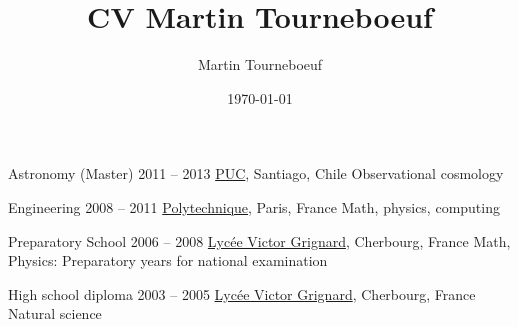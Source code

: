 \def\tbflanguage{english}
\def\tbfbordertop{1}
\def\tbfborderleft{0.7}


%
%

\title{CV Martin Tourneboeuf}
\author{Martin Tourneboeuf}
\date{\today}









\begin{coordinatelist}
\end{coordinatelist}



\begin{yearlist}[7.7][\tbfborderleft][4]


\item[Astronomy (Master)]{2011 -- 2013}
  {
  \href{http://www.uc.cl/}{PUC}, Santiago, Chile
  }
  {   Observational cosmology}


\item[Engineering]{2008 -- 2011}
  {
  \tbfix
  \href{https://www.polytechnique.edu/}{Polytechnique}, Paris, France
  }
  {    Math, physics, computing}


\item[Preparatory School]{2006 -- 2008}
  {
  \href{http://www.lycee-grignard.fr/}{Lyc\'ee Victor Grignard}, Cherbourg, France
  }
  {    Math, Physics: Preparatory years for national examination}


\item[High school diploma]{2003 -- 2005}
  {
  \href{http://www.lycee-grignard.fr/}{Lyc\'ee Victor Grignard}, Cherbourg, France
  }
  {    Natural science}

\end{yearlist}



